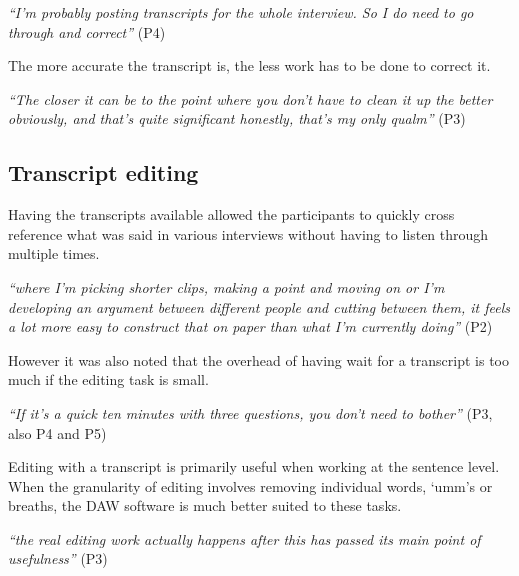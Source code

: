 \textit{``I'm probably posting transcripts for the whole interview. So I do
  need to go through and correct''} (P4)

The more accurate the transcript is, the less work has to be done to correct
it.

\textit{``The closer it can be to the point where you don't have to clean it up
  the better obviously, and that's quite significant honestly, that's my only
  qualm''} (P3)



\subsection{Transcript editing}

Having the transcripts available allowed the participants to quickly cross
reference what was said in various interviews without having to listen through
multiple times.

\textit{``where I'm picking shorter clips, making a point and moving on or I'm
  developing an argument between different people and cutting between them, it
  feels a lot more easy to construct that on paper than what I'm currently
  doing''} (P2)

However it was also noted that the overhead of having wait for a transcript is
too much if the editing task is small.

\textit{``If it's a quick ten minutes with three questions, you don't need to
  bother''} (P3, also P4 and P5)


Editing with a transcript is primarily useful when working at the sentence
level. When the granularity of editing involves removing individual words,
`umm's or breaths, the DAW software is much better suited to these tasks. 

\textit{``the real editing work actually happens after this has passed its main
  point of usefulness''} (P3)



